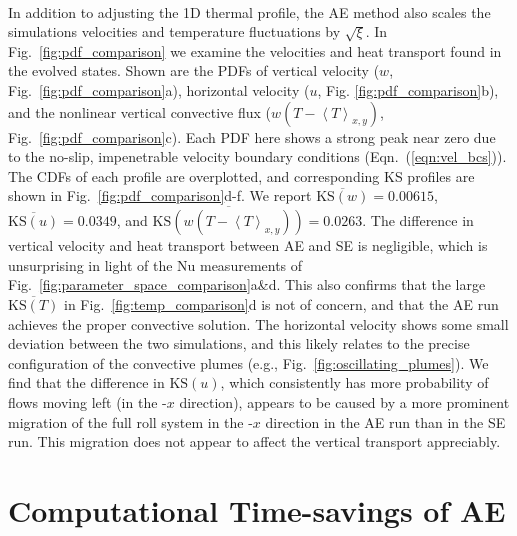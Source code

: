 \documentclass[aps, pre, onecolumn, nofootinbib, notitlepage, groupedaddress, amsfonts, amssymb, amsmath, longbibliography]{revtex4-1}
\newcommand{\angles}[1]{\ensuremath{\left\langle #1 \right\rangle}}
\newcommand{\KS}[1]{\ensuremath{\text{KS}(#1)}}
\newcommand{\KSstat}[1]{\ensuremath{\overline{\text{KS}(#1)}}}
\begin{document}
\newpage$\,$\newpage


In addition to adjusting the 1D thermal profile, the AE method also scales the
simulations velocities and temperature fluctuations by $\sqrt{\xi}$. 
In Fig.~\ref{fig:pdf_comparison}
we examine the velocities and heat transport found in the evolved states.
Shown are the PDFs of 
vertical velocity ($w$, Fig.~\ref{fig:pdf_comparison}a), horizontal velocity ($u$, Fig. \ref{fig:pdf_comparison}b),
and the nonlinear vertical convective flux ($w(T - \angles{T}_{x,y})$, Fig.~\ref{fig:pdf_comparison}c). 
Each PDF here shows a strong peak near zero due to the no-slip, impenetrable
velocity boundary conditions (Eqn.~(\ref{eqn:vel_bcs})).
The CDFs of each profile are overplotted, and corresponding KS profiles are
shown in Fig.~\ref{fig:pdf_comparison}d-f.  We report
$\KSstat{w} = 0.00615$, $\KSstat{u} = 0.0349$,
and $\KSstat{w(T - \angles{T}_{x,y})} = 0.0263$.
The difference in vertical velocity
and heat transport between AE and SE is negligible, which is unsurprising in light of
the Nu measurements of Fig.~\ref{fig:parameter_space_comparison}a\&d.
This also confirms that the large $\KSstat{T}$ in Fig.~\ref{fig:temp_comparison}d is
not of concern, and that the AE run achieves the proper convective solution.
The horizontal velocity shows some small deviation between the two simulations, and this
likely relates to the precise configuration of the convective plumes (e.g., Fig.~\ref{fig:oscillating_plumes}).
We find that the difference in $\KS{u}$, which consistently has more probability
of flows moving left (in the -$x$ direction), appears to be caused by a more prominent migration 
of the full roll system in the -$x$ direction in the AE run than in the SE run. 
This migration does not appear to affect the vertical transport appreciably.


\section{Computational Time-savings of AE}
\label{sec:speedups}
\end{document}

